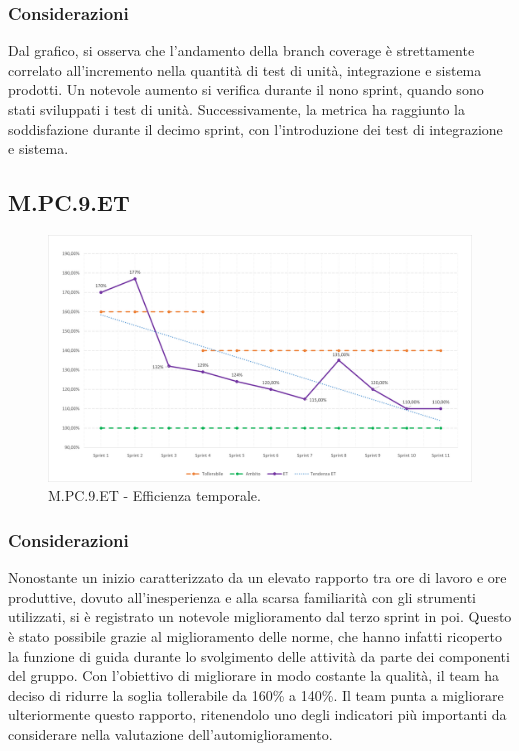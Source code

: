 \documentclass[10pt, a4paper]{article}
\begin{document}
\subsubsection{Considerazioni}
Dal grafico, si osserva che l'andamento della branch coverage è strettamente correlato all'incremento nella quantità di test di unità, integrazione e sistema prodotti. Un notevole aumento si verifica durante il nono sprint, quando sono stati sviluppati i test di unità. Successivamente, la metrica ha raggiunto la soddisfazione durante il decimo sprint, con l'introduzione dei test di integrazione e sistema.

\subsection{M.PC.9.ET}
\begin{figure}[H]
\includegraphics[width=15.5cm]{img/metriche/MPC9ET.png}
\caption{M.PC.9.ET - Efficienza temporale.}
\end{figure}
\subsubsection{Considerazioni}
Nonostante un inizio caratterizzato da un elevato rapporto tra ore di lavoro e ore produttive, dovuto all'inesperienza e alla scarsa familiarità con gli strumenti utilizzati, si è registrato un notevole miglioramento dal terzo sprint in poi.
Questo è stato possibile grazie al miglioramento delle norme, che hanno infatti ricoperto la funzione di guida durante lo svolgimento delle attività da parte dei componenti del gruppo.
Con l'obiettivo di migliorare in modo costante la qualità, il team ha deciso di ridurre la soglia tollerabile da 160\% a 140\%.
Il team punta a migliorare ulteriormente questo rapporto, ritenendolo uno degli indicatori più importanti da considerare nella valutazione dell'automiglioramento.
\end{document}
